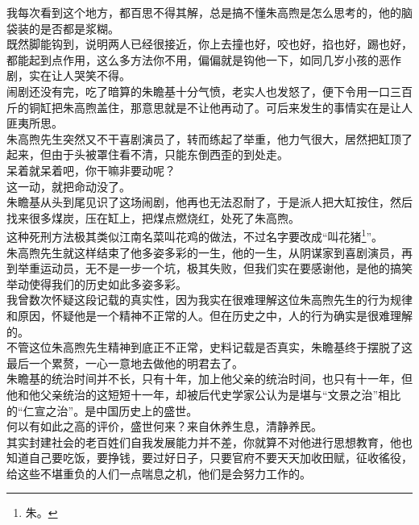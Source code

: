 \begin{multicols}{\theparacolNo}
我每次看到这个地方，都百思不得其解，总是搞不懂朱高煦是怎么思考的，他的脑袋装的是否都是浆糊。\\

既然脚能钩到，说明两人已经很接近，你上去撞也好，咬也好，掐也好，踢也好，都能起到点作用，这么多方法你不用，偏偏就是钩他一下，如同几岁小孩的恶作剧，实在让人哭笑不得。\\

闹剧还没有完，吃了暗算的朱瞻基十分气愤，老实人也发怒了，便下令用一口三百斤的铜缸把朱高煦盖住，那意思就是不让他再动了。可后来发生的事情实在是让人匪夷所思。\\

朱高煦先生突然又不干喜剧演员了，转而练起了举重，他力气很大，居然把缸顶了起来，但由于头被罩住看不清，只能东倒西歪的到处走。\\

呆着就呆着吧，你干嘛非要动呢？\\

这一动，就把命动没了。\\

朱瞻基从头到尾见识了这场闹剧，他再也无法忍耐了，于是派人把大缸按住，然后找来很多煤炭，压在缸上，把煤点燃烧红，处死了朱高煦。\\

这种死刑方法极其类似江南名菜叫花鸡的做法，不过名字要改成“叫花猪\footnote{朱。}”。\\

朱高煦先生就这样结束了他多姿多彩的一生，他的一生，从阴谋家到喜剧演员，再到举重运动员，无不是一步一个坑，极其失败，但我们实在要感谢他，是他的搞笑举动使得我们的历史如此多姿多彩。\\

我曾数次怀疑这段记载的真实性，因为我实在很难理解这位朱高煦先生的行为规律和原因，怀疑他是一个精神不正常的人。但在历史之中，人的行为确实是很难理解的。\\

不管这位朱高煦先生精神到底正不正常，史料记载是否真实，朱瞻基终于摆脱了这最后一个累赘，一心一意地去做他的明君去了。\\

朱瞻基的统治时间并不长，只有十年，加上他父亲的统治时间，也只有十一年，但他和他父亲统治的这短短十一年，却被后代史学家公认为是堪与“文景之治”相比的“仁宣之治”。是中国历史上的盛世。\\

何以有如此之高的评价，盛世何来？来自休养生息，清静养民。\\

其实封建社会的老百姓们自我发展能力并不差，你就算不对他进行思想教育，他也知道自己要吃饭，要挣钱，要过好日子，只要官府不要天天加收田赋，征收徭役，给这些不堪重负的人们一点喘息之机，他们是会努力工作的。\\


\end{multicols}
